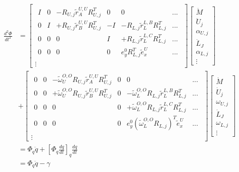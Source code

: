 \begin{equation}
\begin{split}
\frac{d^2\Phi}{dt^2}&=
\begin{bmatrix}
\begin{array}{cccccc} %
I & 0 & -R_{U,j}{\tilde r}^{U,U}_A R_{U,j}^T & 0 & 0 & ... \\
0 & I & +R_{U,j}{\tilde r}^{U,U}_B R_{U,j}^T & -I& -R_{L,j}{\tilde r}^{L,B}_L R_{L,j}^T & ...\\
0 & 0 & 0 & I & +R_{L,j}{\tilde r}^{L,C}_L R_{L,j}^T & ... \\
0 & 0 & 0 & 0 & e_{y}^0 R_{L,j}^T \tilde{e}_{x}^{U} & ... 
\end{array}\\
\vdots
\end{bmatrix}
\begin{bmatrix}
\ddot{M} \\
\ddot{U}_j \\
\alpha_{U,j} \\
\dot{L}_J \\
\alpha_{L,j} \\
\vdots
\end{bmatrix} \label{eq:PhiDDot3D}\\
&+
\begin{bmatrix}
\begin{array}{cccccc} %
0 & 0 & -{\tilde{\omega}^{O,O}_{U}}R_{U,j}{\tilde r}^{U,U}_A R_{U,j}^T & 0 & 0 & ... \\
0 & 0 & +{\tilde{\omega}^{O,O}_{U}}R_{U,j}{\tilde r}^{U,U}_B R_{U,j}^T & 0& -{\tilde{\omega}^{O,O}_{L}}R_{L,j}{\tilde r}^{L,B}_L R_{L,j}^T & ...\\
0 & 0 & 0 & 0 & +{\tilde{\omega}^{O,O}_{L}}R_{L,j}{\tilde r}^{L,C}_L R_{L,j}^T & ... \\
0 & 0 & 0 & 0 & e_{y}^0 ({\tilde{\omega}^{O,O}_{L}}R_{L,j} )^T \tilde{e}_{x}^{U} & ... 
\end{array}\\
\vdots
\end{bmatrix}
\begin{bmatrix}
\dot{M} \\
\dot{U}_j \\
\omega_{U,j} \\
\dot{L}_J \\
\omega_{L,j} \\
\vdots
\end{bmatrix} \\
&=\Phi_q \ddot{q} + [\Phi_{q}\tfrac{dq}{dt}]_q\tfrac{dq}{dt} \\
&=\Phi_q \ddot{q}-\gamma
\end{split}
\end{equation}


